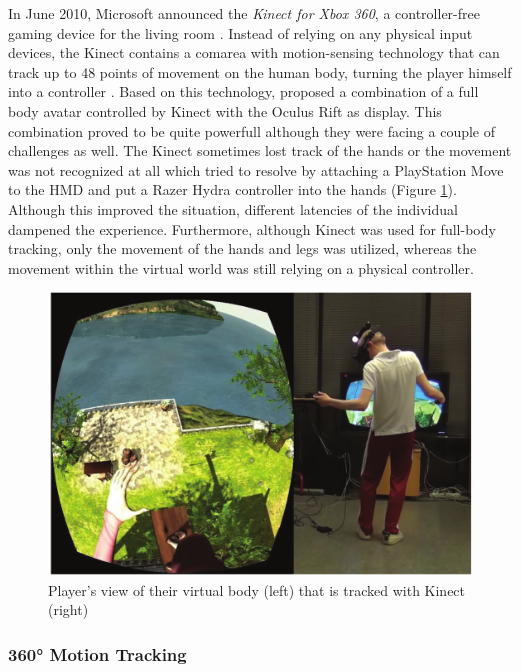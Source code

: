 In June 2010, Microsoft announced the \textit{Kinect for Xbox 360}, a controller-free gaming device for the living room \citep{Microsoft2010}. Instead of relying on any physical input devices, the Kinect contains a comarea with motion-sensing technology that can track up to 48 points of movement on the human body, turning the player himself into a controller \citep{Microsoft2010}. \newline
Based on this technology, \cite{Takala2014} proposed a combination of a full body avatar controlled by Kinect with the Oculus Rift as display. This combination proved to be quite powerfull although they were facing a couple of challenges as well. The Kinect sometimes lost track of the hands or the movement was not recognized at all which \cite{Takala2014} tried to resolve by attaching a PlayStation Move to the HMD and put a Razer Hydra controller into the hands (Figure \ref{fig:kinectbody}). Although this improved the situation, different latencies of the individual dampened the experience. Furthermore, although Kinect was used for full-body tracking, only the movement of the hands and legs was utilized, whereas the movement within the virtual world was still relying on a physical controller.
\begin{figure}[h]
	\begin{center}
		\includegraphics[width=12cm]{03_Figures/05_LitReview/Takala2014_KinectBody.png}
		\caption[Player's view of their virtual body that is tracked with Kinect]{Player's view of their virtual body (left) that is tracked with Kinect (right) \citep{Takala2014}}
		\label{fig:kinectbody}
	\end{center}
\end{figure}


\subsubsection{360° Motion Tracking}
\label{360MotionTracking}

